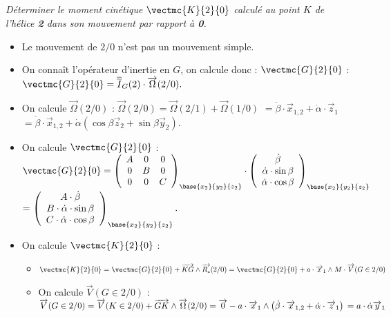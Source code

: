 \begin{multicols}{2}
\subparagraph{} \textit{Déterminer le moment cinétique $\vectmc{K}{2}{0}$  calculé au point $K$ de l'hélice \textbf{2} dans son mouvement par rapport à \textbf{0}.}
\ifprof
\begin{corrige}
\begin{itemize}
\item Le mouvement de $2/0$ n'est pas un mouvement simple. 
\item On connaît l'opérateur d'inertie en $G$, on calcule donc : $\vectmc{G}{2}{0}$ :$
\vectmc{G}{2}{0}=\overline{\overline{I}}_G(2)\cdot \overrightarrow{\Omega}(2/0).$

\item On calcule $\overrightarrow{\Omega}(2/0)$ :
$\overrightarrow{\Omega}(2/0)=\overrightarrow{\Omega}(2/1)+\overrightarrow{\Omega}(1/0)$ 
$=\dot{\beta}\cdot \overrightarrow{x}_{1,2}+\dot{\alpha}\cdot \overrightarrow{z}_{1}$
$=\dot{\beta}\cdot \overrightarrow{x}_{1,2}
+\dot{\alpha}\left(\cos\beta\overrightarrow{z}_2+\sin\beta\overrightarrow{y}_2\right)$.

\item On calcule $\vectmc{G}{2}{0}$ : 
$
\vectmc{G}{2}{0}=\left(
\begin{array}{ccc}
A & 0 & 0 \\ 
0 & B & 0 \\ 
0 & 0 & C
\end{array}
\right)_{\base{{x}_2}{{y}_2}{{z}_2}} \cdot 
\left(
\begin{array}{c}
\dot{\beta}\\
\dot{\alpha}\cdot \sin\beta\\
\dot{\alpha}\cdot \cos\beta\\
\end{array}
\right)_{\base{{x}_2}{{y}_2}{{z}_2}}$
$=\left(
\begin{array}{c}
A\cdot \dot{\beta}\\
B\cdot \dot{\alpha}\cdot \sin\beta\\
C\cdot \dot{\alpha}\cdot \cos\beta\\
\end{array}
\right)_{\base{{x}_2}{{y}_2}{{z}_2}}.$

\item On calcule $\vectmc{K}{2}{0}$ : 
\begin{itemize}
\item $\vectmc{K}{2}{0}=\vectmc{G}{2}{0}+\overrightarrow{KG}\wedge \overrightarrow{R_c}(2/0)
=\vectmc{G}{2}{0}+a\cdot \overrightarrow{x}_1\wedge M\cdot \overrightarrow{V}(G\in 2/0)$
\item On calcule $\overrightarrow{V}(G\in 2/0)$ : 
$\overrightarrow{V}(G\in 2/0)=\overrightarrow{V}(K\in 2/0)+\overrightarrow{GK}\wedge \overrightarrow{\Omega}(2/0)=
\overrightarrow{0}-a\cdot \overrightarrow{x}_1\wedge \left(\dot{\beta}\cdot \overrightarrow{x}_{1,2}+\dot{\alpha}\cdot \overrightarrow{z}_{1}\right)\\
=a\cdot \dot{\alpha}\overrightarrow{y}_{1} $


\end{itemize}
\end{itemize}
\end{corrige}
\end{multicols}
